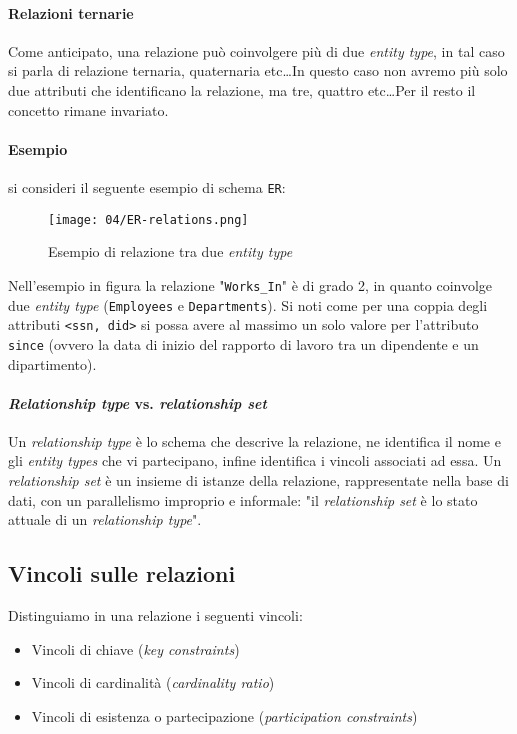         \paragraph{Relazioni ternarie} Come anticipato, una relazione può coinvolgere più di due \textit{entity type}, in tal caso si parla di relazione ternaria, quaternaria etc\dots In questo caso non avremo più solo due attributi che identificano la relazione, ma tre, quattro etc\dots Per il resto il concetto rimane invariato.
        \paragraph{Esempio} si consideri il seguente esempio di schema \texttt{ER}:
            \begin{figure}[H]
                \centering
                \texttt{[image: 04/ER-relations.png]}
                \caption{Esempio di relazione tra due \textit{entity type}}
            \end{figure}
            Nell'esempio in figura la relazione "\texttt{Works\_In}" è di grado 2, in quanto coinvolge due \textit{entity type} (\texttt{Employees} e \texttt{Departments}).\newline
            Si noti come per una coppia degli attributi \texttt{<ssn, did>} si possa avere al massimo un solo valore per l'attributo \texttt{since} (ovvero la data di inizio del rapporto di lavoro tra un dipendente e un dipartimento).
        \paragraph{\textit{Relationship type} vs. \textit{relationship set}} Un \textit{relationship type} è lo schema che descrive la relazione, ne identifica il nome e gli \textit{entity types} che vi partecipano, infine identifica i vincoli associati ad essa. Un \textit{relationship set} è un insieme di istanze della relazione, rappresentate nella base di dati, con un parallelismo improprio e informale: "il \textit{relationship set} è lo stato attuale di un \textit{relationship type}".
    \subsection{Vincoli sulle relazioni}
        Distinguiamo in una relazione i seguenti vincoli:
        \begin{itemize}
            \item Vincoli di chiave (\textit{key constraints})
            \item Vincoli di cardinalità (\textit{cardinality ratio})
            \item Vincoli di esistenza o partecipazione (\textit{participation constraints})
        \end{itemize}
